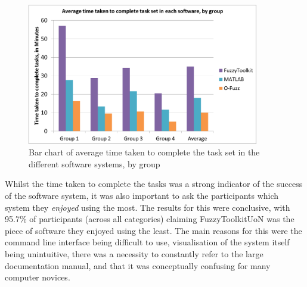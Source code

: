 \begin{figure}[ht!]
	\begin{center}
		\includegraphics[width=0.9\textwidth]{images/timeTaken}
	\end{center}
	\vspace{-5mm}
	\captionsetup{justification=centering,margin=2cm}
	\caption{Bar chart of average time taken to complete the task set in the different software systems, by group}
	\label{fig:times}
	\vspace{-2mm}
\end{figure}
\noindent 						
Whilst the time taken to complete the tasks was a strong indicator of the success of the software system, it was also important to ask the participants which system they \emph{enjoyed} using the most. The results for this were conclusive, with 95.7\% of participants (across all categories) claiming FuzzyToolkitUoN was the piece of software they enjoyed using the least. The main reasons for this were the command line interface being difficult to use, visualisation of the system itself being unintuitive, there was a necessity to constantly refer to the large documentation manual, and that it was conceptually confusing for many computer novices. 

